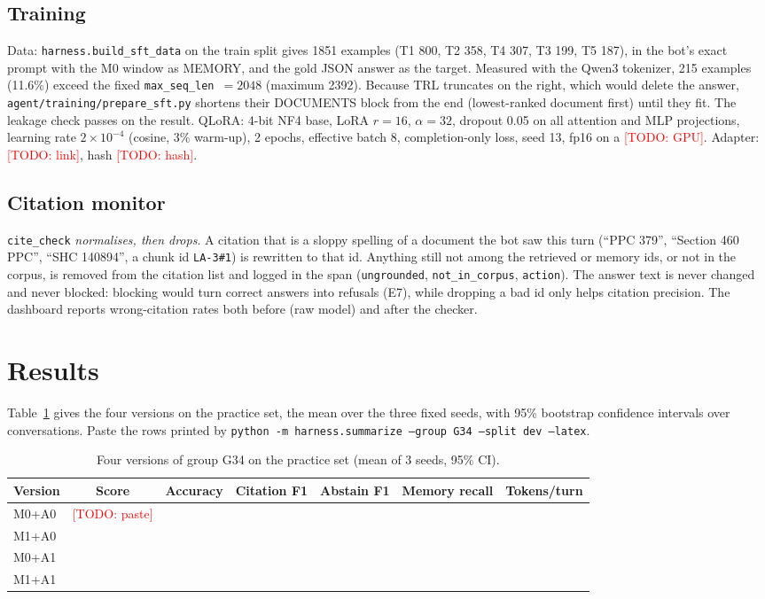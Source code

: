 \documentclass[11pt]{article}
\newcommand{\groupid}{G34}
\newcommand{\todo}[1]{\textcolor{red}{[TODO: #1]}}
\begin{document}
\subsection{Training}
Data: \texttt{harness.build\_sft\_data} on the train split gives 1851 examples (T1 800, T2 358,
T4 307, T3 199, T5 187), in the bot's exact prompt with the M0 window as MEMORY, and the gold JSON
answer as the target. Measured with the Qwen3 tokenizer, 215 examples (11.6\%) exceed the fixed
\texttt{max\_seq\_len}~$=2048$ (maximum 2392). Because TRL truncates on the right, which would delete
the answer, \texttt{agent/training/prepare\_sft.py} shortens their DOCUMENTS block from the end
(lowest-ranked document first) until they fit. The leakage check passes on the result.
QLoRA: 4-bit NF4 base, LoRA $r{=}16$, $\alpha{=}32$, dropout 0.05 on all attention and MLP
projections, learning rate $2\times10^{-4}$ (cosine, 3\% warm-up), 2 epochs, effective batch 8,
completion-only loss, seed 13, fp16 on a \todo{GPU}. Adapter: \todo{link}, hash \todo{hash}.

\subsection{Citation monitor}
\texttt{cite\_check} \emph{normalises, then drops}. A citation that is a sloppy spelling of a
document the bot saw this turn (``PPC 379'', ``Section 460 PPC'', ``SHC 140894'', a chunk id
\texttt{LA-3\#1}) is rewritten to that id. Anything still not among the retrieved or memory ids,
or not in the corpus, is removed from the citation list and logged in the span
(\texttt{ungrounded}, \texttt{not\_in\_corpus}, \texttt{action}). The answer text is never changed
and never blocked: blocking would turn correct answers into refusals (E7), while dropping a bad id
only helps citation precision. The dashboard reports wrong-citation rates both before (raw model)
and after the checker.

\section{Results}
\label{sec:\groupid-results}

Table~\ref{tab:\groupid-main} gives the four versions on the practice set, the mean over the three
fixed seeds, with 95\% bootstrap confidence intervals over conversations. Paste the rows printed
by \texttt{python -m harness.summarize --group \groupid{} --split dev --latex}.

\begin{table}[h]
\centering\small
\caption{Four versions of group \groupid{} on the practice set (mean of 3 seeds, 95\% CI).}
\label{tab:\groupid-main}
\begin{tabular}{lcccccr}
\toprule
Version & Score & Accuracy & Citation F1 & Abstain F1 & Memory recall & Tokens/turn \\
\midrule
M0+A0 & \todo{paste} & & & & & \\
M1+A0 & & & & & & \\
M0+A1 & & & & & & \\
M1+A1 & & & & & & \\
\bottomrule
\end{tabular}
\end{table}
\end{document}
